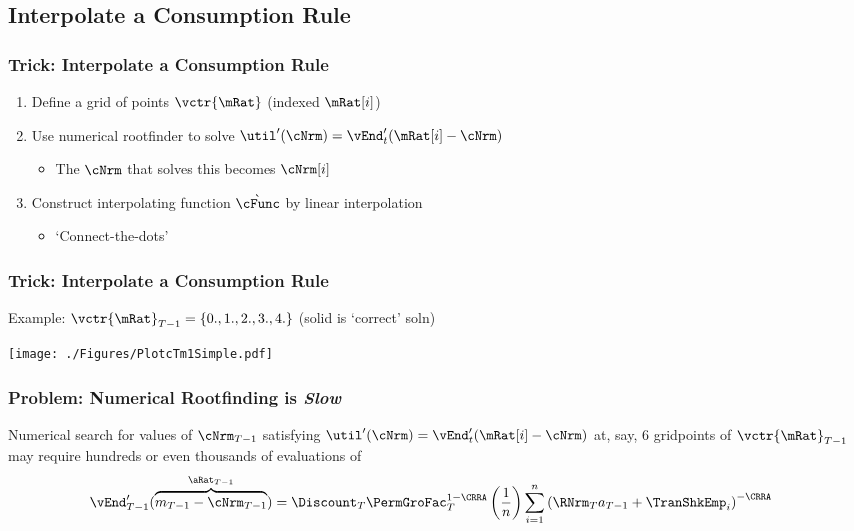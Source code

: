 \documentclass{beamer}
\begin{document}
\subsection{Interpolate a Consumption Rule}
\begin{frame}
\frametitle{Trick: Interpolate a Consumption Rule}

\begin{enumerate}
\item Define a grid of points $\vctr{\mRat}$ (indexed $\mRat[i]$)
\item Use numerical rootfinder to solve 
$\util^{\prime}(\cNrm) = \vEnd^{\prime}_{t}(\mRat[i]-\cNrm)$
\begin{itemize}
\item The $\cNrm$ that solves this becomes $\cNrm[i]$
\end{itemize}
\item Construct interpolating function $\grave{\cFunc}$ by linear interpolation
\begin{itemize}
\item `Connect-the-dots'
\end{itemize}
\end{enumerate}

\end{frame}






\begin{frame}[label=DiscretizeEqn]
\frametitle{Trick: Interpolate a Consumption Rule}

Example: $\vctr{\mRat}_{T-1} = \{0.,1.,2.,3.,4.\}$ (solid is `correct' soln)

\texttt{[image: ./Figures/PlotcTm1Simple.pdf]}

\end{frame}

\begin{frame}[label=vEndtSlow]
\frametitle{Problem: Numerical Rootfinding is {\it Slow}}

Numerical search for values of $\cNrm_{T-1}$ satisfying
$\util^{\prime}(\cNrm) = \vEnd^{\prime}_{t}(\mRat[i]-\cNrm)$ at, say,
6 gridpoints of $\vctr{\mRat}_{T-1}$ may require hundreds or even thousands of
evaluations of
\begin{equation}\begin{gathered}\begin{aligned}
        \vEnd^{\prime}_{T-1}(\overbrace{{m}_{T-1}-{\cNrm}_{T-1}}^{\aRat_{T-1}})  & =   \Discount_{T} \PermGroFac_{T}^{1-\CRRA}\left(\frac{1}{n}\right)\sum_{i=1}^{n}   \left( \RNrm_{T} {a}_{T-1} + \TranShkEmp_{i}\right)^{-\CRRA} \notag
\end{aligned}\end{gathered}\end{equation}

\end{frame}
\end{document}
